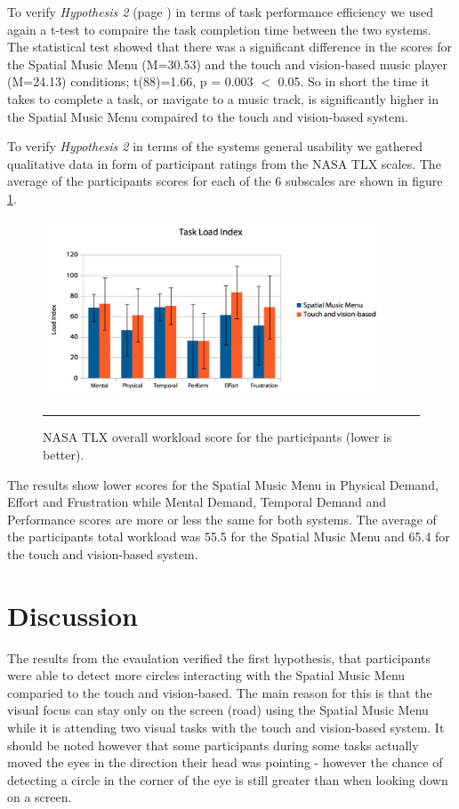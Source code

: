 To verify \textit{Hypothesis 2} (page \pageref{sec:evaluationhypothesis}) in terms of task performance efficiency we used again a t-test to compaire the task completion time between the two systems. The statistical test showed that there was a significant difference in the scores for the Spatial Music Menu (M=30.53) and the touch and vision-based music player (M=24.13) conditions; t(88)=1.66, p = 0.003 $<$ 0.05. So in short the time it takes to complete a task, or navigate to a music track, is significantly higher in the Spatial Music Menu compaired to the touch and vision-based system.

To verify \textit{Hypothesis 2} in terms of the systems general usability we gathered qualitative data in form of participant ratings from the NASA TLX scales. The average of the participants scores for each of the 6 subscales are shown in figure \ref{fig:resultsnasatlx}.

\begin{figure}[h]
	\centering
		\includegraphics[width=0.9\textwidth,height=\textheight,keepaspectratio]{./Figures/results_taskloadindex.png}
		\rule{35em}{1pt}
	\caption[Results NASA TLX Score]{NASA TLX overall workload score for the participants (lower is better).}
	\label{fig:resultsnasatlx}
\end{figure}

The results show lower scores for the Spatial Music Menu in Physical Demand, Effort and Frustration while Mental Demand, Temporal Demand and Performance scores are more or less the same for both systems. The average of the participants total workload was 55.5 for the Spatial Music Menu and 65.4 for the touch and vision-based system.


\section{Discussion}
The results from the evaulation verified the first hypothesis, that participants were able to detect more circles interacting with the Spatial Music Menu comparied to the touch and vision-based. The main reason for this is that the visual focus can stay only on the screen (road) using the Spatial Music Menu while it is attending two visual tasks with the touch and vision-based system. It should be noted however that some participants during some tasks actually moved the eyes in the direction their head was pointing - however the chance of detecting a circle in the corner of the eye is still greater than when looking down on a screen.

